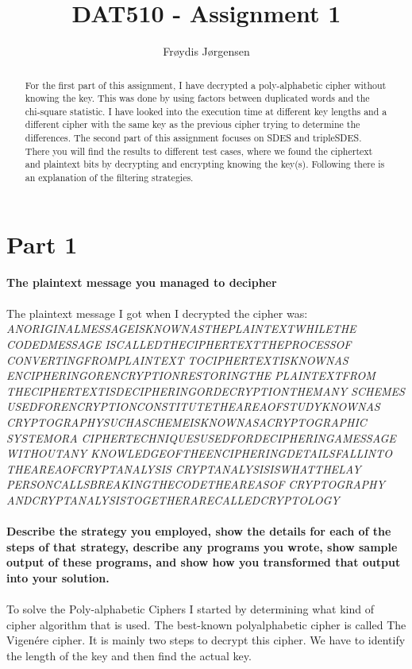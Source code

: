 \documentclass[12pt, letterpaper]{article}
\title{DAT510 - Assignment 1}
\author{Fr\o ydis J\o rgensen}
\begin{document}
\begin{titlepage}
\maketitle
\end{titlepage}


\begin{abstract}
For the first part of this assignment, I have decrypted a poly-alphabetic cipher without knowing the key. This was done by using factors between duplicated words and the chi-square statistic. I have looked into the execution time at different key lengths and a different cipher with the same key as the previous cipher trying to determine the differences. The second part of this assignment focuses on SDES and tripleSDES. There you will find the results to different test cases, where we found the ciphertext and plaintext bits by decrypting and encrypting knowing the key(s). Following there is an explanation of the filtering strategies.
\end{abstract}

\section*{Part 1}
\textbf{The plaintext message you managed to decipher} \\
\\
The plaintext message I got when I decrypted the cipher was:\\
\textit{
ANORIGINALMESSAGEISKNOWNASTHEPLAINTEXTWHILETHE\\CODEDMESSAGE
ISCALLEDTHECIPHERTEXTTHEPROCESSOF\\CONVERTINGFROMPLAINTEXT
TOCIPHERTEXTISKNOWNAS\\ENCIPHERINGORENCRYPTIONRESTORINGTHE
PLAINTEXTFROM\\THECIPHERTEXTISDECIPHERINGORDECRYPTIONTHEMANY
SCHEMES\\USEDFORENCRYPTIONCONSTITUTETHEAREAOFSTUDYKNOWNAS
CRYPTOGRAPHYSUCHASCHEMEISKNOWNASACRYPTOGRAPHIC\\SYSTEMORA
CIPHERTECHNIQUESUSEDFORDECIPHERINGAMESSAGE\\WITHOUTANY
KNOWLEDGEOFTHEENCIPHERINGDETAILSFALLINTO\\THEAREAOFCRYPTANALYSIS
CRYPTANALYSISISWHATTHELAY\\PERSONCALLSBREAKINGTHECODETHEAREASOF
CRYPTOGRAPHY\\ANDCRYPTANALYSISTOGETHERARECALLEDCRYPTOLOGY}\\
\\
\textbf{Describe the strategy you employed, show the details for each of the steps of that strategy, describe any programs you wrote, show sample output of these programs, and show how you transformed that output into your solution.} \\
\\
To solve the Poly-alphabetic Ciphers I started by determining what kind of cipher algorithm that is used.
The best-known polyalphabetic cipher is called The Vigenére cipher. It is mainly two steps to decrypt this cipher.
We have to identify the length of the key and then find the actual key. 
\end{document}
